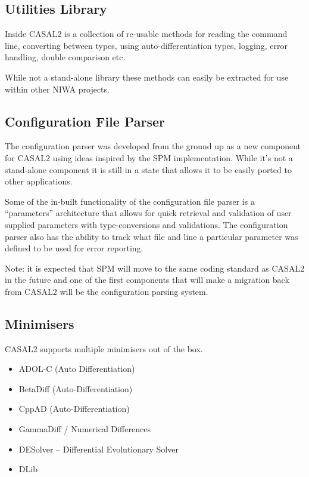 \documentclass[a4paper,11pt,twoside,pdftex,draft]{article}
\providecommand{\tightlist}{%
  \setlength{\itemsep}{0pt}\setlength{\parskip}{0pt}}
\begin{document}
\hypertarget{utilities-library}{%
\subsection[Utilities
Library]{\texorpdfstring{\protect\hypertarget{anchor-29}{}{}Utilities
Library}{Utilities Library}}\label{utilities-library}}

Inside CASAL2 is a collection of re-usable methods for reading the
command line, converting between types, using auto-differentiation
types, logging, error handling, double comparison etc.

While not a stand-alone library these methods can easily be extracted
for use within other NIWA projects.

\hypertarget{configuration-file-parser}{%
\subsection[Configuration File
Parser]{\texorpdfstring{\protect\hypertarget{anchor-30}{}{}Configuration
File
Parser}{Configuration File Parser}}\label{configuration-file-parser}}

The configuration parser was developed from the ground up as a new
component for CASAL2 using ideas inspired by the SPM implementation.
While it's not a stand-alone component it is still in a state that
allows it to be easily ported to other applications.

Some of the in-built functionality of the configuration file parser is a
``parameters'' architecture that allows for quick retrieval and
validation of user supplied parameters with type-conversions and
validations. The configuration parser also has the ability to track what
file and line a particular parameter was defined to be used for error
reporting.

Note: it is expected that SPM will move to the same coding standard as
CASAL2 in the future and one of the first components that will make a
migration back from CASAL2 will be the configuration parsing system.

\hypertarget{minimisers}{%
\subsection[Minimisers]{\texorpdfstring{\protect\hypertarget{anchor-31}{}{}Minimisers}{Minimisers}}\label{minimisers}}

CASAL2 supports multiple minimisers out of the box.

\begin{itemize}
\tightlist
\item
  ADOL-C (Auto Differentiation)
\item
  BetaDiff (Auto-Differentiation)
\item
  CppAD (Auto-Differentiation)
\item
  GammaDiff / Numerical Differences
\item
  DESolver -- Differential Evolutionary Solver
\item
  DLib
\end{itemize}
\end{document}
